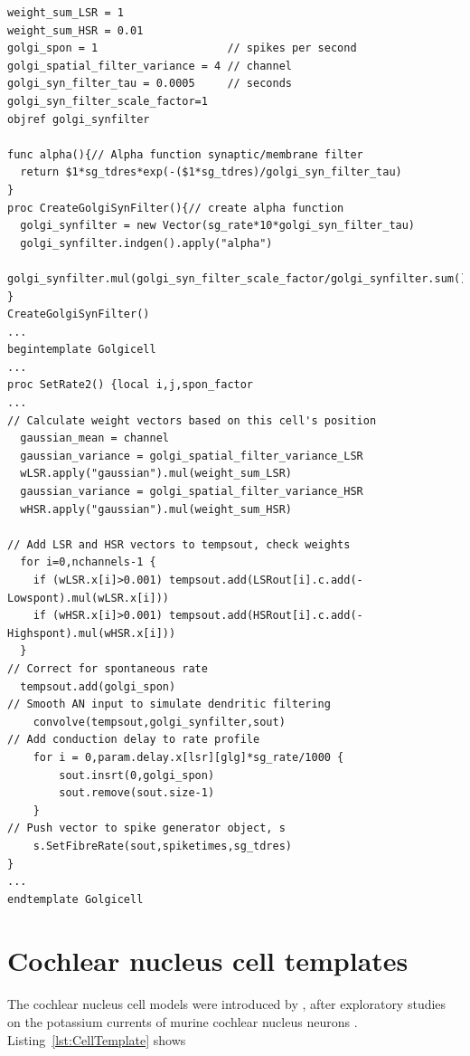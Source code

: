  \begin{lstlisting}[label=GolgiTemplate,caption=Create golgi cell rate vector
   within Golgi template (in CNcell.tem)]
weight_sum_LSR = 1
weight_sum_HSR = 0.01
golgi_spon = 1                    // spikes per second
golgi_spatial_filter_variance = 4 // channel 
golgi_syn_filter_tau = 0.0005     // seconds 
golgi_syn_filter_scale_factor=1
objref golgi_synfilter

func alpha(){// Alpha function synaptic/membrane filter 
  return $1*sg_tdres*exp(-($1*sg_tdres)/golgi_syn_filter_tau)
}
proc CreateGolgiSynFilter(){// create alpha function 
  golgi_synfilter = new Vector(sg_rate*10*golgi_syn_filter_tau)
  golgi_synfilter.indgen().apply("alpha")  
  golgi_synfilter.mul(golgi_syn_filter_scale_factor/golgi_synfilter.sum()) 
}
CreateGolgiSynFilter()
...
begintemplate Golgicell
...
proc SetRate2() {local i,j,spon_factor
...
// Calculate weight vectors based on this cell's position 
  gaussian_mean = channel
  gaussian_variance = golgi_spatial_filter_variance_LSR
  wLSR.apply("gaussian").mul(weight_sum_LSR)
  gaussian_variance = golgi_spatial_filter_variance_HSR
  wHSR.apply("gaussian").mul(weight_sum_HSR)

// Add LSR and HSR vectors to tempsout, check weights 
  for i=0,nchannels-1 {
    if (wLSR.x[i]>0.001) tempsout.add(LSRout[i].c.add(-Lowspont).mul(wLSR.x[i]))
    if (wHSR.x[i]>0.001) tempsout.add(HSRout[i].c.add(-Highspont).mul(wHSR.x[i]))
  }
// Correct for spontaneous rate 
  tempsout.add(golgi_spon)
// Smooth AN input to simulate dendritic filtering 
    convolve(tempsout,golgi_synfilter,sout)
// Add conduction delay to rate profile 
    for i = 0,param.delay.x[lsr][glg]*sg_rate/1000 {
        sout.insrt(0,golgi_spon)
        sout.remove(sout.size-1)
    }
// Push vector to spike generator object, s 
    s.SetFibreRate(sout,spiketimes,sg_tdres)
}
...
endtemplate Golgicell
\end{lstlisting}


\section{Cochlear nucleus cell templates}

The cochlear nucleus cell models were introduced by \citet{RothmanManis:2003b},
after exploratory studies on the potassium currents of murine cochlear nucleus
neurons
\citep{RothmanManis:2003,RothmanManis:2003a}. Listing~\ref{lst:CellTemplate}
shows

